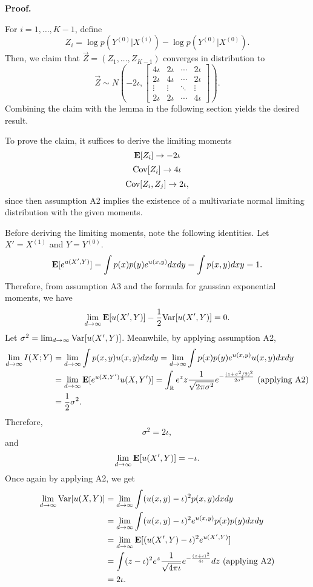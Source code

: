 \documentclass[12pt]{article}
\begin{document}
\textbf{Proof.}

For $i = 1,\hdots, K-1$, define
\[
Z_i = \log p(Y^{(0)}|X^{(i)}) - \log p(Y^{(0)}|X^{(0)}).
\]
Then, we claim that $\vec{Z} = (Z_1,\hdots, Z_{K-1})$ converges in distribution to
\[
\vec{Z} \sim N\left(-2\iota, 
\begin{bmatrix}
4\iota & 2\iota & \cdots & 2\iota\\
2\iota & 4\iota & \cdots & 2\iota\\
\vdots & \vdots & \ddots & \vdots\\
2\iota & 2\iota & \cdots & 4\iota
\end{bmatrix}
\right).
\]
Combining the claim with the lemma in the following section yields the
desired result.

To prove the claim, it suffices to derive the limiting moments
\[\textbf{E}[Z_i] \to -2\iota\]
\[\text{Cov}[Z_i] \to 4\iota\]
\[\text{Cov}[Z_i, Z_j] \to 2\iota,\]
since then assumption A2 implies the existence of a multivariate normal
limiting distribution with the given moments.

Before deriving the limiting moments, note the following identities.
Let $X' = X^{(1)}$ and $Y = Y^{(0)}$.
\[
\textbf{E}[e^{u(X', Y)}] = \int p(x) p(y) e^{u(x, y)} dx dy = \int p(x, y) dxy = 1.
\]
Therefore, from assumption A3 and the formula for gaussian exponential
moments, we have
\[
\lim_{d \to \infty} \textbf{E}[u(X', Y)]-\frac{1}{2}\text{Var}[u(X', Y)] = 0.
\]
Let $\sigma^2 = \lim_{d \to \infty} \text{Var}[u(X', Y)]$.
Meanwhile, by applying assumption A2,
\begin{align*}
\lim_{d \to \infty} I(X; Y) &= \lim_{d \to \infty} \int p(x, y) u(x, y) dx dy 
= \lim_{d \to \infty} \int p(x) p(y) e^{u(x, y)} u(x, y) dx dy
\\&= \lim_{d \to \infty}  \textbf{E}[e^{u(X, Y')}u(X, Y')]
= \int_{\mathbb{R}} e^z z \frac{1}{\sqrt{2\pi \sigma^2}} 
e^{-\frac{(z + \sigma^2/2)^2}{2\sigma^2}} \text{ (applying A2)}
\\&= \frac{1}{2}\sigma^2.
\end{align*}
Therefore,
\[
\sigma^2 = 2\iota,
\]
and
\[
\lim_{d \to \infty} \textbf{E}[u(X', Y)] = -\iota.
\]
Once again by applying A2, we get
\begin{align*}
\lim_{d \to \infty} \text{Var}[u(X, Y)] 
&= \lim_{d \to \infty} \int (u(x, y) - \iota)^2 p(x, y) dx dy
\\&= \lim_{d \to \infty} \int (u(x, y) - \iota)^2 e^{u(x, y)} p(x) p(y) dx dy
\\&= \lim_{d \to \infty} \textbf{E}[(u(X', Y) - \iota)^2 e^{u(X', Y)}] 
\\&= \int (z - \iota)^2 e^z \frac{1}{\sqrt{4\pi\iota}} e^{-\frac{(z+\iota)^2}{4\iota}} dz \text{ (applying A2)}
\\&= 2\iota.
\end{align*}
\end{document}
